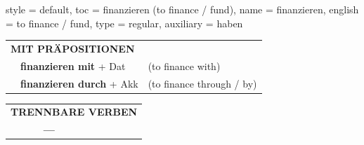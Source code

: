 \begin{verbentry}{
  style = {default},
  toc = {finanzieren (to finance / fund)},
  name = {finanzieren},
  english = {to finance / fund},
  type = {regular},
  auxiliary = {haben}
}
\vspace{10pt}

\begin{tabular}{lll}
\multicolumn{3}{l}{\textbf{MIT PRÄPOSITIONEN}}\\
& \textbf{finanzieren mit} + Dat & (to finance with)\\
& \textbf{finanzieren durch} + Akk & (to finance through / by)\\
\end{tabular}
\hfill
\begin{tabular}{lll}
\multicolumn{3}{l}{\textbf{TRENNBARE VERBEN}}\\
& \textbf{---} & \\
\end{tabular}
\vspace{-5pt}
\end{verbentry}

